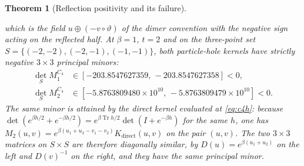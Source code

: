 \documentclass[11pt]{article}
\newtheorem{theorem}{Theorem}[section]
\theoremstyle{definition}
\theoremstyle{remark}
\DeclareMathOperator{\Tr}{Tr}
\begin{document}
\begin{theorem}[Reflection positivity and its failure]
\begin{enumerate}[label=(\roman*),leftmargin=2.2em]
\begin{equation}
\label{eq:c4h}
\end{equation}
which is the field $u\oplus(-v\circ\vartheta)$ of the dimer convention with the
negative sign acting on the reflected half. At $\beta=1$, $t=2$ and on the
three-point set $S=\{(-2,-2),(-2,-1),(-1,-1)\}$, both particle-hole kernels have
strictly negative
$3\times3$ principal minors:
\begin{equation}
\begin{aligned}
\det_{S}M_1^{C_4}&\in[-203.8547627359,\,-203.8547627358]<0,\\
\det_{S}M_2^{C_4}&\in[-5.8763809480\times10^{10},\,-5.8763809479\times10^{10}]<0 .
\end{aligned}
\label{eq:c4fail}
\end{equation}
The same minor is attained by the direct kernel evaluated at \eqref{eq:c4h}: because
$\det(e^{\beta h/2}+e^{-\beta h/2})=e^{\beta\Tr h/2}\det(I+e^{-\beta h})$ for the same
$h$, one has $M_2(u,v)=e^{\beta(u_1+u_2-v_1-v_2)}K_{\mathrm{direct}}(u,v)$ on the pair
$(u,v)$. The two $3\times3$ matrices on $S\times S$ are therefore diagonally similar,
by $D(u)=e^{\beta(u_1+u_2)}$ on the left and $D(v)^{-1}$ on the right, and they have
the same principal minor.
\end{enumerate}
\end{theorem}
\end{document}
